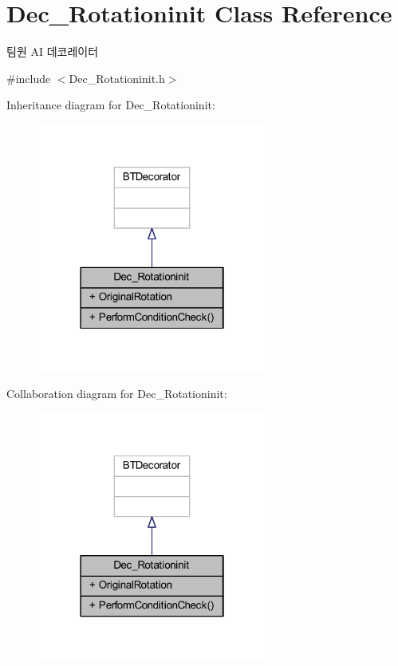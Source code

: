 \hypertarget{class_dec___rotationinit}{}\section{Dec\+\_\+\+Rotationinit Class Reference}
\label{class_dec___rotationinit}


팀원 AI 데코레이터  




{\ttfamily \#include $<$Dec\+\_\+\+Rotationinit.\+h$>$}



Inheritance diagram for Dec\+\_\+\+Rotationinit\+:\nopagebreak
\begin{figure}[H]
\begin{center}
\leavevmode
\includegraphics[width=214pt]{class_dec___rotationinit__inherit__graph}
\end{center}
\end{figure}


Collaboration diagram for Dec\+\_\+\+Rotationinit\+:\nopagebreak
\begin{figure}[H]
\begin{center}
\leavevmode
\includegraphics[width=214pt]{class_dec___rotationinit__coll__graph}
\end{center}
\end{figure}
